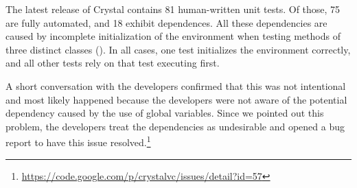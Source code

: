 
The latest release of Crystal contains 81 human-written unit tests. 
Of those, 75 are fully automated, and 18 exhibit
dependences.
All these dependencies are caused by incomplete initialization of the
environment when testing methods of three distinct classes
().
In all cases, one test initializes the environment correctly, and all
other tests rely on that test executing first. 

A short conversation with the developers confirmed that this was not
intentional and most likely happened because the developers were not
aware of the potential dependency caused by the use of global
variables. Since we pointed out this problem, the developers treat the
dependencies as undesirable and opened a bug report to have this issue
resolved.\footnote{\url{https://code.google.com/p/crystalvc/issues/detail?id=57}}

%
%
%
%

